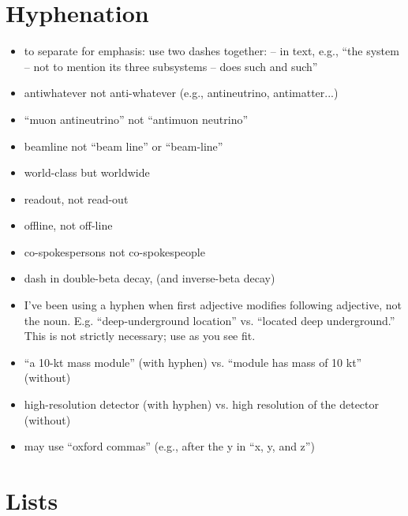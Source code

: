 \section{Hyphenation}
\label{sec:hyphen}

\begin{itemize}
\item to separate for emphasis: use two dashes together: -- in text, e.g.,  ``the system -- not to mention its three subsystems -- does such and such'' 
\item antiwhatever not anti-whatever (e.g., antineutrino, antimatter...)
\item ``muon antineutrino'' not ``antimuon neutrino''
\item beamline not ``beam line'' or ``beam-line'' 
\item world-class but worldwide   
\item readout, not read-out
\item offline, not off-line
\item co-spokespersons not co-spokespeople
\item dash in double-beta decay, (and inverse-beta decay)
\item I've been using a hyphen when first adjective modifies following adjective, not the noun. E.g. ``deep-underground location'' vs. ``located deep underground.''  This is not strictly necessary; use as you see fit.
\item ``a 10-kt mass module'' (with hyphen) vs. ``module has mass of 10 kt'' (without)
\item high-resolution detector (with hyphen) vs. high resolution of the detector (without)
\item may use ``oxford commas'' (e.g., after the y in ``x, y, and z'')
\end{itemize}

\section{Lists}
\label{sec:lists}

